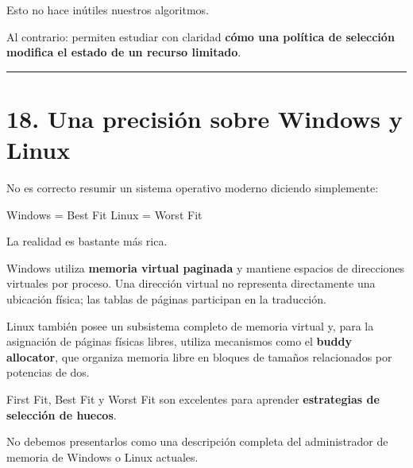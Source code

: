 \documentclass[
  spanish,
  letterpaper,
]{scrbook}
\newenvironment{Shaded}{\begin{snugshade}}{\end{snugshade}}
\newcommand{\NormalTok}[1]{\textcolor[rgb]{0.00,0.23,0.31}{#1}}
\begin{document}
Esto no hace inútiles nuestros algoritmos.

Al contrario: permiten estudiar con claridad \textbf{cómo una política
de selección modifica el estado de un recurso limitado}.

\begin{center}\rule{0.5\linewidth}{0.5pt}\end{center}


\chapter{18. Una precisión sobre Windows y
Linux}\label{una-precisiuxf3n-sobre-windows-y-linux-1}

No es correcto resumir un sistema operativo moderno diciendo
simplemente:

\begin{Shaded}
\begin{Highlighting}[]
\NormalTok{Windows = Best Fit}
\NormalTok{Linux   = Worst Fit}
\end{Highlighting}
\end{Shaded}

La realidad es bastante más rica.

Windows utiliza \textbf{memoria virtual paginada} y mantiene espacios de
direcciones virtuales por proceso. Una dirección virtual no representa
directamente una ubicación física; las tablas de páginas participan en
la traducción.

Linux también posee un subsistema completo de memoria virtual y, para la
asignación de páginas físicas libres, utiliza mecanismos como el
\textbf{buddy allocator}, que organiza memoria libre en bloques de
tamaños relacionados por potencias de dos.

\begin{tcolorbox}[enhanced jigsaw, arc=.35mm, bottomrule=.15mm, bottomtitle=1mm, breakable, colback=white, colbacktitle=quarto-callout-important-color!10!white, colframe=quarto-callout-important-color-frame, coltitle=black, left=2mm, leftrule=.75mm, opacityback=0, opacitybacktitle=0.6, rightrule=.15mm, title=\textcolor{quarto-callout-important-color}{\faExclamation}\hspace{0.5em}{Qué debemos conservar}, titlerule=0mm, toprule=.15mm, toptitle=1mm]

First Fit, Best Fit y Worst Fit son excelentes para aprender
\textbf{estrategias de selección de huecos}.

No debemos presentarlos como una descripción completa del administrador
de memoria de Windows o Linux actuales.

\end{tcolorbox}
\end{document}
